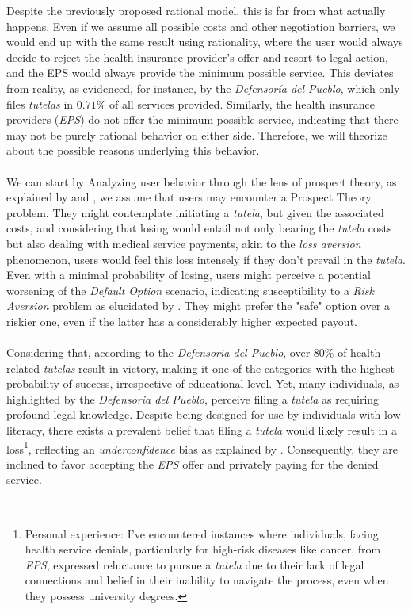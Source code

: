 \documentclass[12pt]{article}
\begin{document}
\begin{flushleft}

    Despite the previously proposed rational model, this is far from what actually happens. Even if we assume all possible costs and other negotiation barriers, we would end up with the same result using rationality, where the user would always decide to reject the health insurance provider's offer and resort to legal action, and the EPS would always provide the minimum possible service. This deviates from reality, as evidenced, for instance, by the \textit{Defensoría del Pueblo}, which only files \textit{tutelas} in $0.71\%$ of all services provided. Similarly, the health insurance providers (\textit{EPS}) do not offer the minimum possible service, indicating that there may not be purely rational behavior on either side. Therefore, we will theorize about the possible reasons underlying this behavior.\\~\\

    We can start by Analyzing user behavior through the lens of prospect theory, as explained by \citet{thaler1980toward} and \citet{tversky1991loss}, we assume that users may encounter a Prospect Theory problem. They might contemplate initiating a \textit{tutela}, but given the associated costs, and considering that losing would entail not only bearing the \textit{tutela} costs but also dealing with medical service payments, akin to the \textit{loss aversion} phenomenon, users would feel this loss intensely if they don't prevail in the \textit{tutela}. Even with a minimal probability of losing, users might perceive a potential worsening of the \textit{Default Option} scenario, indicating susceptibility to a \textit{Risk Aversion} problem as elucidated by \citet{rabin2000risk}. They might prefer the "safe" option over a riskier one, even if the latter has a considerably higher expected payout.\\~\\

    Considering that, according to the \textit{Defensoria del Pueblo}, over $80\%$ of health-related \textit{tutelas} result in victory, making it one of the categories with the highest probability of success, irrespective of educational level. Yet, many individuals, as highlighted by the \textit{Defensoria del Pueblo}, perceive filing a \textit{tutela} as requiring profound legal knowledge. Despite being designed for use by individuals with low literacy, there exists a prevalent belief that filing a \textit{tutela} would likely result in a loss\footnote{Personal experience: I've encountered instances where individuals, facing health service denials, particularly for high-risk diseases like cancer, from \textit{EPS}, expressed reluctance to pursue a \textit{tutela} due to their lack of legal connections and belief in their inability to navigate the process, even when they possess university degrees.}, reflecting an \textit{underconfidence} bias as explained by \citet{bjorkman1993realism}. Consequently, they are inclined to favor accepting the \textit{EPS} offer and privately paying for the denied service.\\~\\
    

\end{flushleft}
\end{document}
